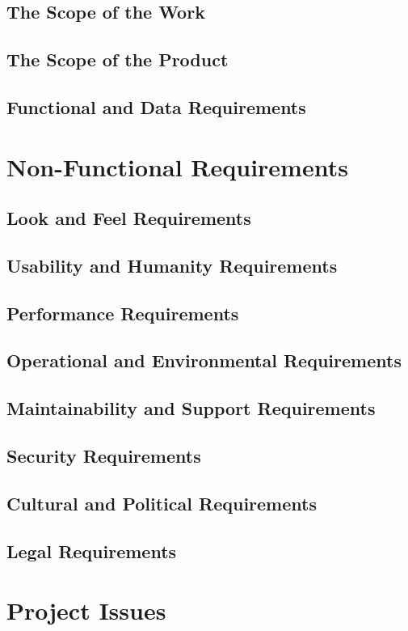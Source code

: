 \documentclass[12pt]{article}
\begin{document}
	\subsection{The Scope of the Work}
	\subsection{The Scope of the Product}
	\subsection{Functional and Data Requirements}
	\section{Non-Functional Requirements}
	\subsection{Look and Feel Requirements}
	\subsection{Usability and Humanity Requirements}
	\subsection{Performance Requirements}
	\subsection{Operational and Environmental Requirements}
	\subsection{Maintainability and Support Requirements}
	\subsection{Security Requirements}
	\subsection{Cultural and Political Requirements}
	\subsection{Legal Requirements}
	\section{Project Issues}
	
\end{document}
